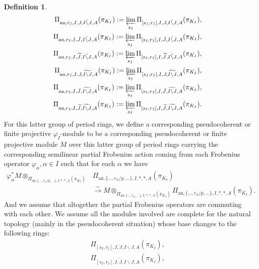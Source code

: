 \documentclass[12pt]{amsart}
\theoremstyle{definition}
\newtheorem{definition}[theorem]{Definition}
\numberwithin{equation}{section}
\begin{document}
\begin{definition}
\begin{align}
\Pi_{\mathrm{an},r_I,I,J,\breve{I\backslash J},A}(\pi_{K_I}):=\varprojlim_{s_I}\Pi_{[s_I,r_I],I,J,\breve{I\backslash J},A}(\pi_{K_I}),\\	
\Pi_{\mathrm{an},r_I,I,\breve{J},\breve{I\backslash J},A}(\pi_{K_I}):=\varprojlim_{s_I} \Pi_{[s_I,r_I],I,\breve{J},\breve{I\backslash J},A}(\pi_{K_I}),\\	
\Pi_{\mathrm{an},r_I,I,\widetilde{J},\breve{I\backslash J},A}(\pi_{K_I}):=\varprojlim_{s_I} \Pi_{[s_I,r_I],I,\widetilde{J},\breve{I\backslash J},A}(\pi_{K_I}),\\
\Pi_{\mathrm{an},r_I,I,J,\widetilde{I\backslash J},A}(\pi_{K_I}):=\varprojlim_{s_I} \Pi_{[s_I,r_I],I,J,\widetilde{I\backslash J},A}(\pi_{K_I}),\\	
\Pi_{\mathrm{an},r_I,I,\breve{J},\widetilde{I\backslash J},A}(\pi_{K_I}):=\varprojlim_{s_I} \Pi_{[s_I,r_I],I,\breve{J},\widetilde{I\backslash J},A}(\pi_{K_I}),\\	
\Pi_{\mathrm{an},r_I,I,\widetilde{J},\widetilde{I\backslash J},A}(\pi_{K_I}):=\varprojlim_{s_I} \Pi_{[s_I,r_I],I,\widetilde{J},\widetilde{I\backslash J},A}(\pi_{K_I}).	
\end{align}
For this latter group of period rings, we define a corresponding pseudocoherent or finite projective $\varphi_I$-module to be a corresponding pseudocoherent or finite projective module $M$ over this latter group of period rings carrying the corresponding semilinear partial Frobenius action coming from each Frobenius operator $\varphi_\alpha,\alpha\in I$ such that for each $\alpha$ we have 
\begin{align}
\varphi_\alpha^*M\otimes_{\Pi_{\mathrm{an},\{...,r_\alpha/p,...\},I,*,*,A}(\pi_{K_I})} &\Pi_{\mathrm{an},\{...,r_\alpha/p,...\},I,*,*,A}(\pi_{K_I})\\
&\overset{\sim}{\longrightarrow} M\otimes_{\Pi_{\mathrm{an},\{...,r_\alpha,...\},I,*,*,A}(\pi_{K_I})}\Pi_{\mathrm{an},\{...,r_\alpha/p,...\},I,*,*,A}(\pi_{K_I}).	
\end{align}
And we assume that altogether the partial Frobenius operators are commuting with each other. We assume all the modules involved are complete for the natural topology (mainly in the pseudocoherent situation) whose base changes to the following rings:
\begin{align}
\Pi_{[s_I,r_I],I,\breve{J},I\backslash J,A}(\pi_{K_I}),\\	
\Pi_{[s_I,r_I],I,\widetilde{J},I\backslash J,A}(\pi_{K_I}),\\

\end{align}
\end{definition}
\end{document}
